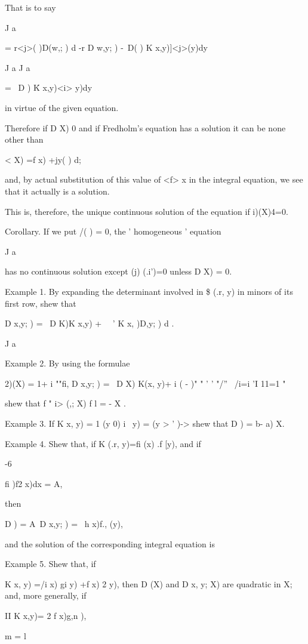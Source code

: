 %
%

That is to say

J a

= r<j>( )D(w,; ) d -r D w,y; ) -\ D( ) K x,y)]<j>(y)dy

J a J a

= \ D ) \' K x,y)<i> y)dy

in virtue of the given equation.

Therefore if D X) 0 and if Fredholm's equation has a solution it can
be none other than

< X) =f x) +jy( ) d;

and, by actual substitution of this value of <f> x in the integral
equation, we see that it actually is a solution.

This is, therefore, the unique continuous solution of the equation if
i)(X)4=0.

Corollary. If we put /( ) = 0, the ' homogeneous ' equation

J a

has no continuous solution except (j) (.i')=0 unless D X) = 0.

Example 1. By expanding the determinant involved in \$ (.r, y) in
minors of its first row, shew that

D x,y; ) = \ D K)K x,y) + \ \ ' K x, )D,y; ) d .

J a

Example 2. By using the formulae

2)(X) = 1+ i ""fi, D x,y; ) = \ D X) K(x, y)+ i ( - )" " ' ' "/'' \
/i=i 'I 11=1 " 

shew that f " i> (,; X) f l = - X .

Example 3. If K x, y) = 1 (y 0) i \ y) = (y > ' )-> shew that D ) = b-
a) X.

Example 4. Shew that, if K (.r, y)=fi (x) .f [y), and if

-6

fi )f2 x)dx = A,

then

D ) = A\ D x,y; ) = \ h x)f., (y),

and the solution of the corresponding integral equation is

%
%

Example 5. Shew that, if

K x, y) =/i x) gi y) +f x) 2 y), then D (X) and D x, y; X) are
quadratic in X; and, more generally, if

II K x,y)= 2 f x)g,n ),

m = l

